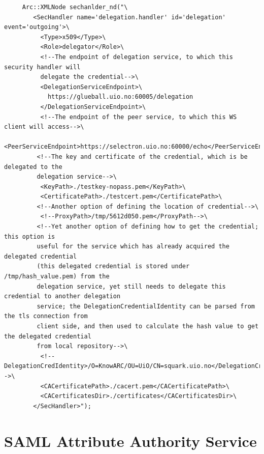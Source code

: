 \documentclass{article}                            %
\begin{document}
\begin{verbatim}
     Arc::XMLNode sechanlder_nd("\ 
        <SecHandler name='delegation.handler' id='delegation' event='outgoing'>\ 
          <Type>x509</Type>\ 
          <Role>delegator</Role>\ 
          <!--The endpoint of delegation service, to which this security handler will 
          delegate the credential-->\
          <DelegationServiceEndpoint>\
            https://glueball.uio.no:60005/delegation
          </DelegationServiceEndpoint>\ 
          <!--The endpoint of the peer service, to which this WS client will access-->\
          <PeerServiceEndpoint>https://selectron.uio.no:60000/echo</PeerServiceEndpoint>\ 
         <!--The key and certificate of the credential, which is be delegated to the 
         delegation service-->\
          <KeyPath>./testkey-nopass.pem</KeyPath>\ 
          <CertificatePath>./testcert.pem</CertificatePath>\ 
         <!--Another option of defining the location of credential-->\
          <!--ProxyPath>/tmp/5612d050.pem</ProxyPath-->\ 
         <!--Yet another option of defining how to get the credential; this option is 
         useful for the service which has already acquired the delegated credential 
         (this delegated credential is stored under /tmp/hash_value.pem) from the 
         delegation service, yet still needs to delegate this credential to another delegation 
         service; the DelegationCredentialIdentity can be parsed from the tls connection from 
         client side, and then used to calculate the hash value to get the delegated credential 
         from local repository-->\
          <!--DelegationCredIdentity>/O=KnowARC/OU=UiO/CN=squark.uio.no</DelegationCredIdentity-->\ 
          <CACertificatePath>./cacert.pem</CACertificatePath>\ 
          <CACertificatesDir>./certificates</CACertificatesDir>\ 
        </SecHandler>"); 
\end{verbatim}




\section{SAML Attribute Authority Service} %
\label{sec:saml_aa_service}


\end{document}
